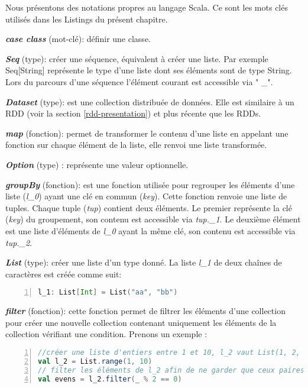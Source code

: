Nous présentons  des notations   propres au langage Scala. Ce  sont les mots clés utilisés  dans les Listings du présent chapitre. \par
\textbf{\textit{case class}} (mot-clé): définir une  classe.\par
\textit{\textbf{Seq}} (type): créer une séquence, équivalent à créer une liste. Par exemple Seq[String] représente le type d'une liste dont ses éléments sont de type String. Lors du parcours d'une séquence  l'élément courant est accessible via " \_".  \par
\textbf{\textit{Dataset}} (type):  est une collection distribuée de données. Elle est similaire à un RDD (voir la section \ref{rdd-presentation}) et plus récente que les RDDs. \par
\textit{\textbf{map}} (fonction): permet de transformer le contenu d'une liste en appelant une fonction sur chaque élément de la liste, elle renvoi une liste transformée. \par
\textit{\textbf{Option}} (type) : représente une valeur optionnelle.  \par
\textit{\textbf{groupBy}} (fonction):  est une fonction utilisée pour regrouper les éléments d'une liste (\textit{l\_0}) ayant une clé en commun (\textit{key}). Cette fonction renvoie une liste de tuples. Chaque tuple (\textit{tup})  contient deux éléments. Le premier représente la clé (\textit{key})  du groupement, son contenu est accessible via \textit{tup.\_1}. Le deuxième élément est une liste d'éléments de \textit{l\_0} ayant la même clé, son contenu est accessible via \textit{tup.\_2}.\par
\textbf{\textit{List}} (type): créer une liste d'un type donné. La liste \textit{l\_1} de deux chaînes de caractères est créée comme suit:
\begin{lstlisting}[language=scala,firstnumber=1,label={lst:case-class-hop}, basicstyle = \footnotesize,escapechar=|,numbers=left,
stepnumber=1]
l_1: List[Int] = List("aa", "bb")
\end{lstlisting} \par
\noindent \textbf{\textit{filter}} (fonction): cette fonction permet de filtrer les éléments d'une collection pour créer une nouvelle collection contenant uniquement les éléments de la collection   vérifiant une condition. Prenons un  exemple : 
\begin{lstlisting}[language=scala,firstnumber=1, basicstyle = \footnotesize,escapechar=|,numbers=left,
stepnumber=1]
//créer une liste d'entiers entre 1 et 10, l_2 vaut List(1, 2, 3, 4, 5, 6, 7, 8, 9)
val l_2 = List.range(1, 10)   
// filter les éléments de l_2 afin de ne garder que ceux paires, evens vaut List(2, 4, 6, 8)
val evens = l_2.filter(_ % 2 == 0)  
\end{lstlisting} \par

